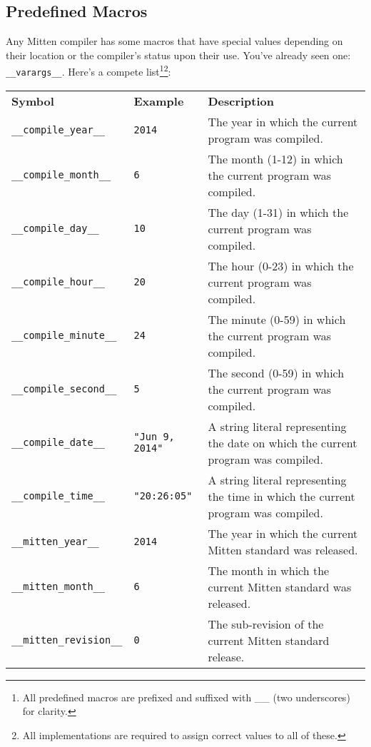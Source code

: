 \documentclass[10pt,a4paper]{article}
\begin{document}
\newpage





\subsection{Predefined Macros}
Any Mitten compiler has some macros that have special values depending on their location or the compiler's status upon their use. You've already seen one: \verb|__varargs__|. Here's a compete list\footnote{All predefined macros are prefixed and suffixed with \_\_ (two underscores) for clarity.}\footnote{All implementations are required to assign correct values to all of these.}:

\begin{tabular}{| l l p{4cm} |}
\hline
\textbf{Symbol} & \textbf{Example} & \textbf{Description} \\
\verb|__compile_year__| & \verb|2014| & The year in which the current program was compiled. \\
\verb|__compile_month__| & \verb|6| & The month (1-12) in which the current program was compiled. \\
\verb|__compile_day__| & \verb|10| & The day (1-31) in which the current program was compiled. \\
\verb|__compile_hour__| & \verb|20| & The hour (0-23) in which the current program was compiled. \\
\verb|__compile_minute__| & \verb|24| & The minute (0-59) in which the current program was compiled. \\
\verb|__compile_second__| & \verb|5| & The second (0-59) in which the current program was compiled. \\
\verb|__compile_date__| & \verb|"Jun 9, 2014"| & A string literal representing the date on which the current program was compiled. \\
\verb|__compile_time__| & \verb|"20:26:05"| & A string literal representing the time in which the current program was compiled. \\
\verb|__mitten_year__| & \verb|2014| & The year in which the current Mitten standard was released. \\
\verb|__mitten_month__| & \verb|6| & The month in which the current Mitten standard was released. \\
\verb|__mitten_revision__| & \verb|0| & The sub-revision of the current Mitten standard release. \\
\hline
\end{tabular}
\end{document}
